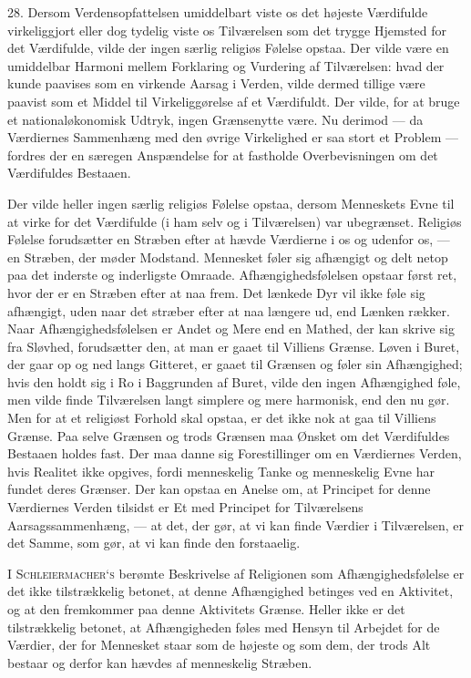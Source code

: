 \documentclass[12pt,a4paper,openany]{book}
\newcommand{\opage}[1]{\marginnote{\footnotesize\textit{[#1]}}}
\begin{document}
28. Dersom Verdensopfattelsen umiddelbart viste os det højeste
Værdifulde virkeliggjort eller dog tydelig viste os Tilværelsen som det
trygge Hjemsted for det Værdifulde, vilde der ingen særlig religiøs
Følelse opstaa. Der vilde være en umiddelbar Harmoni mellem Forklaring
og Vurdering af Tilværelsen: hvad der kunde paavises som en virkende
Aarsag i Verden, vilde dermed tillige være paavist som et Middel til
Virkeliggørelse af et Værdifuldt. Der vilde, for at bruge et
nationaløkonomisk Udtryk, ingen Grænsenytte være. Nu derimod --- da
Værdiernes Sammenhæng med den øvrige Virkelighed er saa stort et Problem
--- fordres der en særegen Anspændelse for at fastholde Overbevisningen
om det Værdifuldes Bestaaen.

Der vilde heller ingen særlig religiøs Følelse opstaa, dersom Menneskets
Evne til at virke for det Værdifulde (i ham selv og i Tilværelsen) var
ubegrænset. Religiøs Følelse forudsætter en Stræben efter at hævde
Værdierne i os og udenfor os, --- en Stræben, der møder Modstand.
Mennesket føler sig afhængigt og delt netop paa det inderste og
inderligste Omraade. Afhængighedsfølelsen opstaar først ret, hvor der er
en Stræben efter at naa frem. Det lænkede Dyr vil ikke føle sig
afhængigt, uden naar det stræber efter at naa længere ud, end Lænken
rækker. Naar Afhængighedsfølelsen er Andet og Mere end en Mathed, der
kan skrive sig fra Sløvhed, forudsætter den, at man er gaaet til
Villiens Grænse. Løven i Buret, der gaar op og ned langs Gitteret, er
gaaet til Grænsen og føler sin Afhængighed; hvis den holdt sig i Ro i
Baggrunden af Buret, vilde den ingen Afhængighed føle, men vilde finde
Tilværelsen langt simplere og mere harmonisk, end den nu gør. Men for at
et religiøst Forhold skal opstaa, er det ikke nok at gaa til Villiens
Grænse. Paa selve Grænsen og trods Grænsen maa Ønsket om det Værdifuldes
Bestaaen holdes fast. Der maa danne sig Forestillinger om en Værdiernes
Verden, hvis Realitet ikke opgives, fordi menneskelig Tanke og
menneskelig Evne har fundet deres Grænser. Der kan opstaa en Anelse om,
at Principet for denne Værdiernes Verden
\opage{69}tilsidst er Et med Principet for Tilværelsens
Aarsagssammenhæng, --- at det, der gør, at vi kan finde Værdier i
Tilværelsen, er det Samme, som gør, at vi kan finde den forstaaelig.

\textsc{I Schleiermacher‘s} berømte Beskrivelse af Religionen som
Afhængighedsfølelse er det ikke tilstrækkelig betonet, at denne
Afhængighed betinges ved en Aktivitet, og at den fremkommer paa denne
Aktivitets Grænse. Heller ikke er det tilstrækkelig betonet, at
Afhængigheden føles med Hensyn til Arbejdet for de Værdier, der for
Mennesket staar som de højeste og som dem, der trods Alt bestaar og
derfor kan hævdes af menneskelig Stræben.
\end{document}
